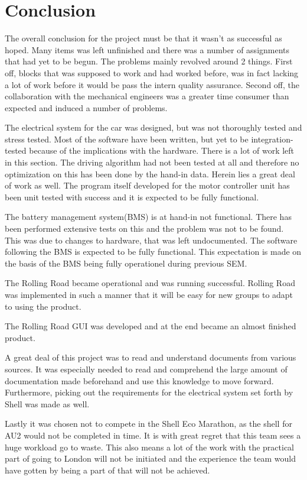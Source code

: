 \chapter{Conclusion}
The overall conclusion for the project must be that it wasn't as successful as hoped. Many items was left unfinished and there was a number of assignments that had yet to be begun. The problems mainly revolved around 2 things. First off, blocks that was supposed to work and had worked before, was in fact lacking a lot of work before it would be pass the intern quality assurance. Second off, the collaboration with the mechanical engineers was a greater time consumer than expected and induced a number of problems.   

The electrical system for the car was designed, but was not thoroughly tested and stress tested. Most of the software have been written, but yet to be integration-tested because of the implications with the hardware. There is a lot of work left in this section. The driving algorithm had not been tested at all and therefore no optimization on this has been done by the hand-in data. Herein lies a great deal of work as well. The program itself developed for the motor controller unit has been unit tested with success and it is expected to be fully functional. 

The battery management system(BMS) is at hand-in not functional. There has been performed extensive tests on this and the problem was not to be found. This was due to changes to hardware, that was left undocumented. The software following the BMS is expected to be fully functional. This expectation is made on the basis of the BMS being fully operationel during previous SEM.

The Rolling Road became operational and was running successful. Rolling Road was implemented in such a manner that it will be easy for new groups to adapt to using the product. 

The Rolling Road GUI was developed and at the end became an almost finished product.

A great deal of this project was to read and understand documents from various sources. It was especially needed to read and comprehend the large amount of documentation made beforehand and use this knowledge to move forward. Furthermore, picking out the requirements for the electrical system set forth by Shell was made as well.

Lastly it was chosen not to compete in the Shell Eco Marathon, as the shell for AU2 would not be completed in time. It is with great regret that this team sees a huge workload go to waste. This also means a lot of the work with the practical part of going to London will not be initiated and the experience the team would have gotten by being a part of that will not be achieved.
